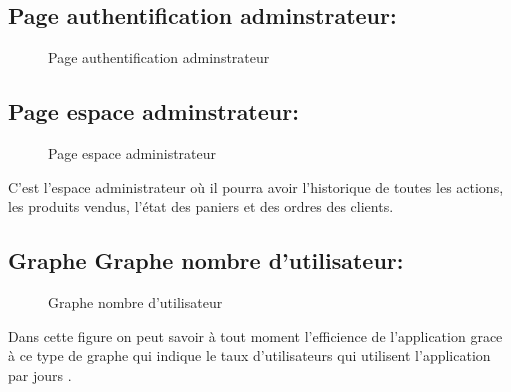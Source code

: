 \documentclass[a4paper]{report}
\begin{document}
\begin{doublespace}
\begin{doublespace}
\begin{doublespace}
\begin{doublespace}
\begin{doublespace}
\begin{doublespace}
                        \subsection{Page authentification adminstrateur:}
                        \begin{figure}[H]
                            \begin{center}
                                \caption{Page authentification adminstrateur}
                            \end{center}
                        \end{figure}
                        \subsection{Page espace adminstrateur:}
                        \begin{figure}[H]
                            \begin{center}
                                \caption{Page espace administrateur}
                            \end{center}
                        \end{figure}
                        C'est l'espace administrateur où il pourra avoir l'historique de toutes les actions, les produits vendus, l'état des paniers et des ordres des clients.
                        \subsection{Graphe Graphe nombre d'utilisateur:}

                        \begin{figure}[H]
                            \begin{center}
                                \caption{Graphe nombre d'utilisateur}
                            \end{center}
                        \end{figure}
                        Dans cette figure on peut savoir à tout moment l'efficience de l'application grace à ce type de graphe qui indique le taux d'utilisateurs qui utilisent l'application par jours .

\end{doublespace}
\end{doublespace}
\end{doublespace}
\end{doublespace}
\end{doublespace}
\end{doublespace}
\end{document}
